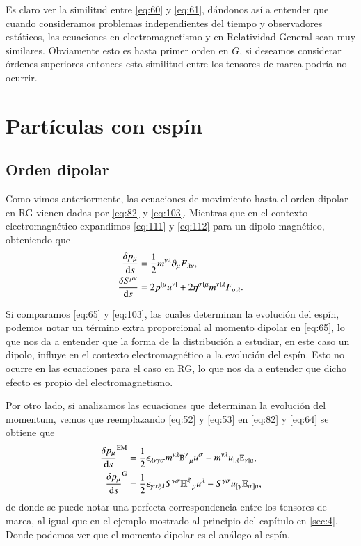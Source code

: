 Es claro ver la similitud entre \eqref{eq:60} y \eqref{eq:61}, dándonos así a entender que cuando consideramos problemas independientes del tiempo y observadores estáticos, las ecuaciones en electromagnetismo y en Relatividad General sean muy similares. Obviamente esto es hasta primer orden en $G$, si deseamos considerar órdenes superiores entonces esta similitud entre los tensores de marea podría no ocurrir.

\section{Partículas con espín}

\subsection{Orden dipolar}
\label{sec:3.6.1}

Como vimos anteriormente, las ecuaciones de movimiento hasta el orden dipolar en RG vienen dadas por \eqref{eq:82} y \eqref{eq:103}. Mientras que en el contexto electromagnético expandimos \eqref{eq:111} y \eqref{eq:112} para un dipolo magnético, obteniendo que
\begin{align}
\label{eq:64}
\frac{\delta p_{\mu}}{\mathrm{d}s} &= \frac{1}{2} m^{\nu \lambda} \partial_{\mu} F_{\lambda \nu}, \\
\label{eq:65}
\frac{\delta S^{\mu \nu}}{\mathrm{d}s} &= 2 p^{[\mu} u^{\nu]} + 2 \eta^{\sigma [ \mu} m^{\nu ] \lambda} F_{\sigma \lambda}.
\end{align}

Si comparamos \eqref{eq:65} y \eqref{eq:103}, las cuales determinan la evolución del espín, podemos notar un término extra proporcional al momento dipolar en \eqref{eq:65}, lo que nos da a entender que la forma de la distribución a estudiar, en este caso un dipolo, influye en el contexto electromagnético a la evolución del espín. Esto no ocurre en las ecuaciones para el caso en RG, lo que nos da a entender que dicho efecto es propio del electromagnetismo.

Por otro lado, si analizamos las ecuaciones que determinan la evolución del momentum, vemos que reemplazando \eqref{eq:52} y \eqref{eq:53} en \eqref{eq:82} y \eqref{eq:64} se obtiene que
\begin{align}
\frac{\delta p_{\mu}}{\mathrm{d}s}^{\mathrm{EM}} &= \frac{1}{2} \epsilon_{\lambda \nu \gamma \sigma} m^{\nu \lambda} \mathtt{B}^{\gamma}_{\ \ \mu} u^{\sigma} - m^{\nu \lambda} u_{[\lambda} \mathtt{E}_{\nu] \mu},\\
\label{eq:66}
\frac{\delta p_{\mu}}{\mathrm{d}s}^{\mathrm{G}} &= \frac{1}{2} \epsilon_{\gamma \sigma \xi \lambda} S^{\gamma \sigma} \mathbb{H}^{\xi}_{\ \ \mu} u^{\lambda} - S^{\gamma \sigma} u_{[\gamma} \mathbb{E}_{\sigma] \mu},
\end{align}
de donde se puede notar una perfecta correspondencia entre los tensores de marea, al igual que en el ejemplo mostrado al principio del capítulo en \ref{sec:4}. Donde podemos ver que el momento dipolar es el análogo al espín.

